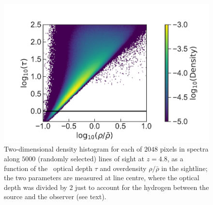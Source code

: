 \begin{figure}
    \centering
    \includegraphics[width=\columnwidth]{"Plots/Chapter1/Optical_depths"}
    \caption[2D histogram of \lya\ optical depth $\tau$ and overdensity $\rho/\bar{\rho}$ at $z=4.8$]{Two-dimensional density histogram for each of $2048$ pixels in spectra along $5000$ (randomly selected) lines of sight at $z=4.8$, as a function of the \lya\ optical depth $\tau$ and overdensity $\rho/\bar{\rho}$ in the sightline; the two parameters are measured at line centre, where the optical depth was divided by $2$ just to account for the hydrogen between the source and the observer (see text).}
    \label{fig:2D scatter}
\end{figure}
